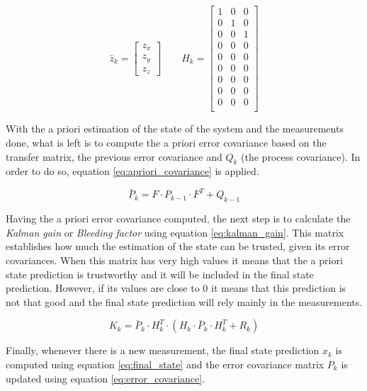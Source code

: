 \begin{equation}
\bar{z}_{k}=
\begin{bmatrix}
z_{x} \\ z_{y} \\ z_{z}
\end{bmatrix}
\qquad
H_{k}=
\begin{bmatrix}
1 & 0 & 0 \\
0 & 1 & 0 \\
0 & 0 & 1 \\
0 & 0 & 0 \\
0 & 0 & 0 \\
0 & 0 & 0 \\
0 & 0 & 0 \\
0 & 0 & 0 \\
0 & 0 & 0 \\
\end{bmatrix}
\label{eq:measurements_mats}
\end{equation}

With the a priori estimation of the state of the system and the measurements done, what is left is to compute the a priori error covariance \cite{OReilly} based on the transfer matrix, the previous error covariance and $Q_{k}$ (the process covariance).
In order to do so, equation \eqref{eq:apriori_covariance} is applied.

\begin{equation}
\bar{P}_{k}=F \cdot P_{k-1} \cdot F^{T}+Q_{k-1}
\label{eq:apriori_covariance}
\end{equation}

Having the a priori error covariance computed, the next step is to calculate the \emph{Kalman gain} or \emph{Bleeding factor} using equation \eqref{eq:kalman_gain}.
This matrix establishes how much the estimation of the state can be trusted, given its error covariances.
When this matrix has very high values it means that the a priori state prediction is trustworthy and it will be included in the final state prediction.
However, if its values are close to 0 it means that this prediction is not that good and the final state prediction will rely mainly in the measurements.

\begin{equation}
K_{k} = \bar{P}_{k} \cdot H_{k}^{T} \cdot (H_{k} \cdot \bar{P}_{k} \cdot H_{k}^{T}+R_{k})
\label{eq:kalman_gain}
\end{equation}

Finally, whenever there is a new measurement, the final state prediction $x_{k}$ is computed using equation \eqref{eq:final_state} and the error covariance matrix $P_{k}$ is updated using equation \eqref{eq:error_covariance}.

